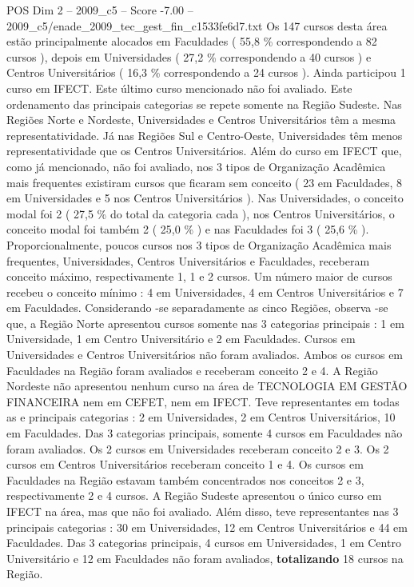 \begin{textsample}{POS Dim 2 – 2009\_c5 – Score -7.00 – 2009\_c5/enade\_2009\_tec\_gest\_fin\_c1533fe6d7.txt}
Os 147 cursos desta área estão principalmente alocados em Faculdades ( 55,8 \% correspondendo a 82 cursos ), depois em Universidades ( 27,2 \% correspondendo a 40 cursos ) e Centros Universitários ( 16,3 \% correspondendo a 24 cursos ).
Ainda participou 1 curso em IFECT.
Este último curso mencionado não foi avaliado.
Este ordenamento das principais categorias se repete somente na Região Sudeste.
Nas Regiões Norte e Nordeste, Universidades e Centros Universitários têm a mesma representatividade.
Já nas Regiões Sul e Centro-Oeste, Universidades têm menos representatividade que os Centros Universitários.
Além do curso em IFECT que, como já mencionado, não foi avaliado, nos 3 tipos de Organização Acadêmica mais frequentes existiram cursos que ficaram sem conceito ( 23 em Faculdades, 8 em Universidades e 5 nos Centros Universitários ).
Nas Universidades, o conceito modal foi 2 ( 27,5 \% do total da categoria cada ), nos Centros Universitários, o conceito modal foi também 2 ( 25,0 \% ) e nas Faculdades foi 3 ( 25,6 \% ).
Proporcionalmente, poucos cursos nos 3 tipos de Organização Acadêmica mais frequentes, Universidades, Centros Universitários e Faculdades, receberam conceito máximo, respectivamente 1, 1 e 2 cursos.
Um número maior de cursos recebeu o conceito mínimo : 4 em Universidades, 4 em Centros Universitários e 7 em Faculdades.
Considerando -se separadamente as cinco Regiões, observa -se que, a Região Norte apresentou cursos somente nas 3 categorias principais : 1 em Universidade, 1 em Centro Universitário e 2 em Faculdades.
Cursos em Universidades e Centros Universitários não foram avaliados.
Ambos os cursos em Faculdades na Região foram avaliados e receberam conceito 2 e 4.
A Região Nordeste não apresentou nenhum curso na área de TECNOLOGIA EM GESTÃO FINANCEIRA nem em CEFET, nem em IFECT.
Teve representantes em todas as e principais categorias : 2 em Universidades, 2 em Centros Universitários, 10 em Faculdades.
Das 3 categorias principais, somente 4 cursos em Faculdades não foram avaliados.
Os 2 cursos em Universidades receberam conceito 2 e 3.
Os 2 cursos em Centros Universitários receberam conceito 1 e 4.
Os cursos em Faculdades na Região estavam também concentrados nos conceitos 2 e 3, respectivamente 2 e 4 cursos.
A Região Sudeste apresentou o único curso em IFECT na área, mas que não foi avaliado.
Além disso, teve representantes nas 3 principais categorias : 30 em Universidades, 12 em Centros Universitários e 44 em Faculdades.
Das 3 categorias principais, 4 cursos em Universidades, 1 em Centro Universitário e 12 em Faculdades não foram avaliados, \textbf{totalizando} 18 cursos na Região.

\end{textsample}
